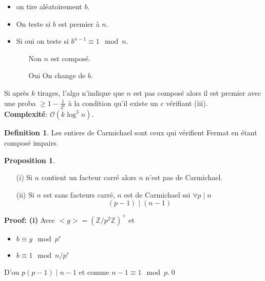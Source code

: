 \documentclass[12pt]{article}
\theoremstyle{plain}
\theoremstyle{definition}
\newtheorem{defn}[subsubsection]{Definition}
\newtheorem{prop}[subsubsection]{Proposition}
\newcommand{\Z}{\mathbb{Z}}
\newcommand{\Or}{\mathcal{O}}
\begin{document}
\begin{itemize}
    \item on tire aléatoirement $b$.
    \item On teste si $b$ est premier à $n$.
    \item Si oui on teste si $b^{n-1}\equiv 1\mod n$.
    \begin{itemize}
        \item[Non] $n$ est composé.
        \item[Oui] On change de $b$.
    \end{itemize}
\end{itemize}
Si après $k$ tirages, l'algo n'indique que $n$ est pas composé 
alors il est premier avec une proba $\geq 1-\frac{1}{2^k}$
à la condition qu'il existe un $c$ vérifiant (iii).\\

\textbf{Complexité}: \(\Or(k\log^3 n)\).
\begin{defn}
    Les entiers de Carmichael sont ceux qui vérifient 
    Fermat en étant composé impairs. 
\end{defn}
\noindent\begin{prop}
    \begin{itemize}(eq)
        \item[(i)]Si $n$ contient un facteur carré 
        alors $n$ n'est pas de Carmichael.
        \item[(ii)]Si $n$ est sans facteurs carré,
        $n$ est de Carmichael ssi $\forall p\mid n$
        \[(p-1)\mid (n-1)\]
    \end{itemize}
\end{prop}

\textbf{Proof: (i)}
Avec \(<g>=(\Z/p^2\Z)^{\times}\) et 
\begin{itemize}
    \item $b\equiv g \mod p^r$
    \item $b\equiv 1\mod n/p^r$
\end{itemize}

D'ou $p(p-1)\mid n-1$ et comme $n-1\equiv 1\mod p$.\qed
\end{document}
